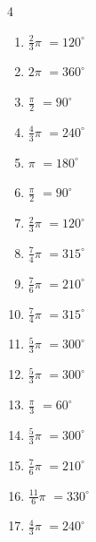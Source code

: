 \begin{multicols}{4}
\begin{enumerate}
  \item $\displaystyle \frac{2}{3}\pi$
        $\displaystyle =120^{\circ}$

  \item $\displaystyle 2\pi$
        $\displaystyle =360^{\circ}$

  \item $\displaystyle \frac{\pi}{2}$
        $\displaystyle =90^{\circ}$

  \item $\displaystyle \frac{4}{3}\pi$
        $\displaystyle =240^{\circ}$

  \item $\displaystyle \pi$
        $\displaystyle =180^{\circ}$

  \item $\displaystyle \frac{\pi}{2}$
        $\displaystyle =90^{\circ}$

  \item $\displaystyle \frac{2}{3}\pi$
        $\displaystyle =120^{\circ}$

  \item $\displaystyle \frac{7}{4}\pi$
        $\displaystyle =315^{\circ}$

  \item $\displaystyle \frac{7}{6}\pi$
        $\displaystyle =210^{\circ}$

  \item $\displaystyle \frac{7}{4}\pi$
        $\displaystyle =315^{\circ}$

  \item $\displaystyle \frac{5}{3}\pi$
        $\displaystyle =300^{\circ}$

  \item $\displaystyle \frac{5}{3}\pi$
        $\displaystyle =300^{\circ}$

  \item $\displaystyle \frac{\pi}{3}$
        $\displaystyle =60^{\circ}$

  \item $\displaystyle \frac{5}{3}\pi$
        $\displaystyle =300^{\circ}$

  \item $\displaystyle \frac{7}{6}\pi$
        $\displaystyle =210^{\circ}$

  \item $\displaystyle \frac{11}{6}\pi$
        $\displaystyle =330^{\circ}$

  \item $\displaystyle \frac{4}{3}\pi$
        $\displaystyle =240^{\circ}$


\end{enumerate}
\end{multicols}
